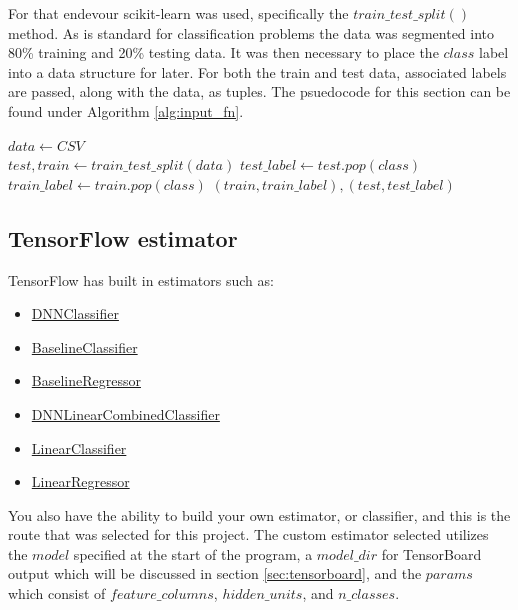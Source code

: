 \documentclass{article}
\begin{document}
    For that endevour scikit-learn was used, specifically the 
    $train\_test\_split()$ method. As is standard for classification problems 
    the data was segmented into 80\% training and 20\% testing data. It was 
    then necessary to place the $class$ label into a data structure for later. 
    For both the train and test data, associated labels are passed, along with 
    the data, as tuples. The psuedocode for this section can be found under 
    Algorithm \ref{alg:input_fn}.
    \begin{algorithm}
        \caption{$input\_fn()$}
        \label{alg:input_fn}
        \begin{algorithmic}
            \STATE $data \gets CSV$\\
            \STATE $test, train \gets train\_test\_split(data)$
            \STATE $test\_label \gets test.pop(class)$
            \STATE $train\_label \gets train.pop(class)$
            \RETURN $(train, train\_label), (test,test\_label)$
        \end{algorithmic}
    \end{algorithm}

\subsection{TensorFlow estimator}
    TensorFlow has built in estimators such as:
    \begin{itemize}
        \item \href{https://www.tensorflow.org/api_docs/python/tf/estimator/DNNClassifier}{DNNClassifier}
        \item \href{https://www.tensorflow.org/api_docs/python/tf/estimator/BaselineClassifier}{BaselineClassifier}
        \item \href{https://www.tensorflow.org/api_docs/python/tf/estimator/BaselineRegressor}{BaselineRegressor}
        \item \href{https://www.tensorflow.org/api_docs/python/tf/estimator/DNNLinearCombinedClassifier}{DNNLinearCombinedClassifier}
        \item \href{https://www.tensorflow.org/api_docs/python/tf/estimator/LinearClassifier}{LinearClassifier}
        \item \href{https://www.tensorflow.org/api_docs/python/tf/estimator/LinearRegressor}{LinearRegressor}
    \end{itemize}
    You also have the ability to build your own estimator, or classifier, and 
    this is the route that was selected for this project. The custom estimator 
    selected utilizes the $model$ specified at the start of the program, a 
    $model\_dir$ for TensorBoard output which will be discussed in section 
    \ref{sec:tensorboard}, and the $params$ which consist of 
    $feature\_columns$, $hidden\_units$, and $n\_classes$.
\end{document}
